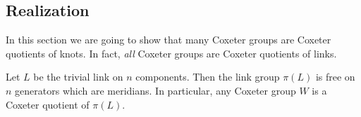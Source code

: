 \documentclass[main.tex]{subfiles}
\begin{document}
%
%
%





\subsection{Realization}
In this section we are going to show that many Coxeter groups are Coxeter quotients of knots. In fact, \textit{all} Coxeter groups are Coxeter quotients of links.

\begin{proposition}\label{prop:trivial-realization}
Let $L$ be the trivial link on $n$ components. Then the link group $\pi(L)$ is free on $n$ generators which are meridians. In particular, any Coxeter group $W$ is a Coxeter quotient of $\pi(L)$.
\end{proposition}
\end{document}
